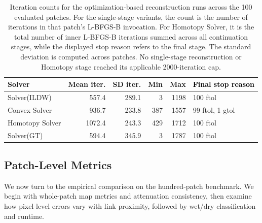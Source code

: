 \documentclass[11pt]{article}
\begin{document}
\begin{table}[H]
  \centering
  \begin{tabular}{lrrrrl}
    \toprule
    Solver & Mean iter. & SD iter. & Min & Max & \textcolor{black}{Final stop reason} \\
    \midrule
    Solver(ILDW) & 557.4 & 289.1 & 3 & 1198 & 100 ftol \\
    Convex Solver & 936.7 & 233.8 & 387 & 1557 & 99 ftol, 1 gtol \\
    Homotopy Solver & 1072.4 & 243.3 & 429 & 1712 & 100 ftol \\
    Solver(GT) & 594.4 & 345.9 & 3 & 1787 & 100 ftol \\
    \bottomrule
  \end{tabular}
  \caption{{\color{black}Iteration counts for the optimization-based reconstruction runs across the 100 evaluated patches. For the single-stage variants, the count is the number of iterations in that patch's L-BFGS-B invocation. For Homotopy Solver, it is the total number of inner L-BFGS-B iterations summed across all continuation stages, while the displayed stop reason refers to the final stage. The standard deviation is computed across patches. No single-stage reconstruction or Homotopy stage reached its applicable 2000-iteration cap.}}
  \label{tab:optimization_iterations}
\end{table}

\subsection{Patch-Level Metrics}
{\color{black}We now turn to the empirical comparison on the hundred-patch benchmark. We begin with whole-patch map metrics and attenuation consistency, then examine how pixel-level errors vary with link proximity, followed by wet/dry classification and runtime.}
\end{document}
